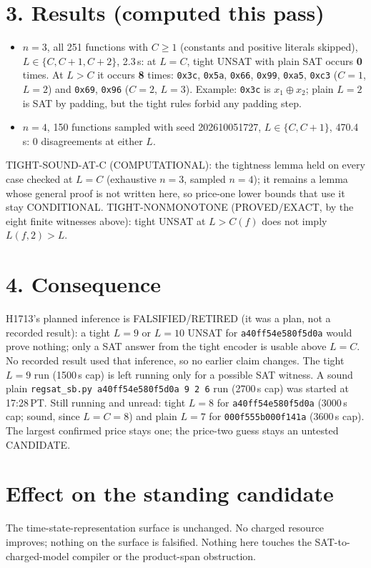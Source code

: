 \documentclass[11pt]{article}
\begin{document}
\section*{3. Results (computed this pass)}
\begin{itemize}
\item $n=3$, all 251 functions with $C\ge1$ (constants and positive literals skipped), $L\in\{C,C+1,C+2\}$, 2.3\,s: at $L=C$, tight UNSAT with plain SAT occurs \textbf{0} times. At $L>C$ it occurs \textbf{8} times: \texttt{0x3c}, \texttt{0x5a}, \texttt{0x66}, \texttt{0x99}, \texttt{0xa5}, \texttt{0xc3} ($C=1$, $L=2$) and \texttt{0x69}, \texttt{0x96} ($C=2$, $L=3$). Example: \texttt{0x3c} is $x_1\oplus x_2$; plain $L=2$ is SAT by padding, but the tight rules forbid any padding step.
\item $n=4$, 150 functions sampled with seed 202610051727, $L\in\{C,C+1\}$, 470.4\,s: 0 disagreements at either $L$.
\end{itemize}
TIGHT-SOUND-AT-C (COMPUTATIONAL): the tightness lemma held on every case checked at $L=C$ (exhaustive $n=3$, sampled $n=4$); it remains a lemma whose general proof is not written here, so price-one lower bounds that use it stay CONDITIONAL. TIGHT-NONMONOTONE (PROVED/EXACT, by the eight finite witnesses above): tight UNSAT at $L>C(f)$ does not imply $L(f,2)>L$.

\section*{4. Consequence}
H1713's planned inference is FALSIFIED/RETIRED (it was a plan, not a recorded result): a tight $L=9$ or $L=10$ UNSAT for \texttt{a40ff54e580f5d0a} would prove nothing; only a SAT answer from the tight encoder is usable above $L=C$. No recorded result used that inference, so no earlier claim changes. The tight $L=9$ run (1500\,s cap) is left running only for a possible SAT witness. A sound plain \texttt{regsat\_sb.py a40ff54e580f5d0a 9 2 6} run (2700\,s cap) was started at 17:28\,PT. Still running and unread: tight $L=8$ for \texttt{a40ff54e580f5d0a} (3000\,s cap; sound, since $L=C=8$) and plain $L=7$ for \texttt{000f555b000f141a} (3600\,s cap). The largest confirmed price stays one; the price-two guess stays an untested CANDIDATE.

\section*{Effect on the standing candidate}
The time-state-representation surface is unchanged. No charged resource improves; nothing on the surface is falsified. Nothing here touches the SAT-to-charged-model compiler or the product-span obstruction.
\end{document}
